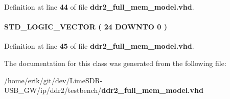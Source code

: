 Definition at line {\bf 44} of file {\bf ddr2\+\_\+full\+\_\+mem\+\_\+model.\+vhd}.

\paragraph[{read\+\_\+address}]{ {\bfseries \textcolor{comment}{S\+T\+D\+\_\+\+L\+O\+G\+I\+C\+\_\+\+V\+E\+C\+T\+OR}\textcolor{vhdlchar}{ }\textcolor{vhdlchar}{(}\textcolor{vhdlchar}{ }\textcolor{vhdlchar}{ } \textcolor{vhdldigit}{24} \textcolor{vhdlchar}{ }\textcolor{keywordflow}{D\+O\+W\+N\+TO}\textcolor{vhdlchar}{ }\textcolor{vhdlchar}{ } \textcolor{vhdldigit}{0} \textcolor{vhdlchar}{ }\textcolor{vhdlchar}{)}\textcolor{vhdlchar}{ }} \hspace{0.3cm}{\ttfamily [Signal]}}\label{classddr2__full__mem__model__ram__module_1_1europa_ac05c190aa4d8192d70c01367f7656446}


Definition at line {\bf 45} of file {\bf ddr2\+\_\+full\+\_\+mem\+\_\+model.\+vhd}.



The documentation for this class was generated from the following file\+:\begin{DoxyCompactItemize}
\item 
/home/erik/git/dev/\+Lime\+S\+D\+R-\/\+U\+S\+B\+\_\+\+G\+W/ip/ddr2/testbench/{\bf ddr2\+\_\+full\+\_\+mem\+\_\+model.\+vhd}\end{DoxyCompactItemize}
